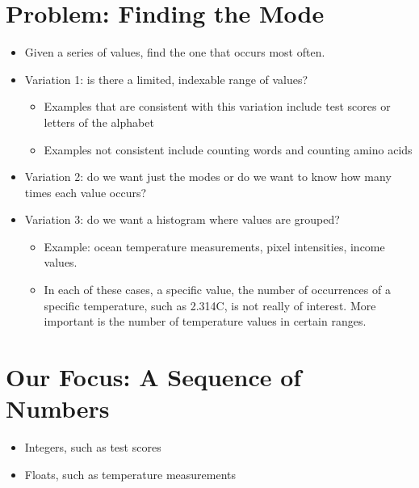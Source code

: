 \documentclass[letterpaper,10pt,english]{sphinxmanual}
\begin{document}
\section{Problem: Finding the Mode}
\label{\detokenize{lecture_notes/lec14_design_part1:problem-finding-the-mode}}\begin{itemize}
\item {} 
Given a series of values, find the one that occurs most often.

\item {} 
Variation 1: is there a limited, indexable range of values?
\begin{itemize}
\item {} 
Examples that are consistent with this variation include test
scores or letters of the alphabet

\item {} 
Examples not consistent include counting words and counting amino
acids

\end{itemize}

\item {} 
Variation 2: do we want just the modes or do we want to know how many
times each value occurs?

\item {} 
Variation 3: do we want a histogram where values are grouped?
\begin{itemize}
\item {} 
Example: ocean temperature measurements, pixel intensities, income
values.

\item {} 
In each of these cases, a specific value, the number of
occurrences of a specific temperature, such as 2.314C, is not really of
interest. More important is the number of temperature values in
certain ranges.

\end{itemize}

\end{itemize}


\section{Our Focus: A Sequence of Numbers}
\label{\detokenize{lecture_notes/lec14_design_part1:our-focus-a-sequence-of-numbers}}\begin{itemize}
\item {} 
Integers, such as test scores

\item {} 
Floats, such as temperature measurements

\end{itemize}
\end{document}
